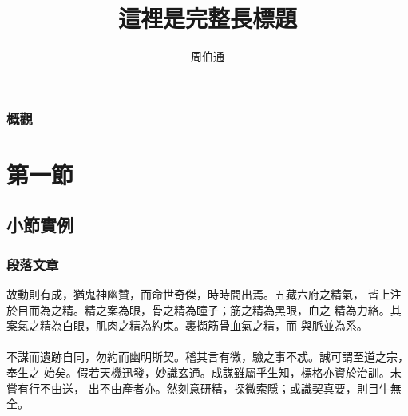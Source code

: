\documentclass{beamer}
\title[這裡是短標題]{\iyan 這裡是完整長標題} %
\author{周伯通} %
\institute[Uranus] %
{
天王星大學\\ %
\medskip
\texttt{john@smith.com} %
}
\date{\zhtoday} %
\begin{document}
\begin{frame}
\titlepage %
\end{frame}

\begin{frame}
\frametitle{\iyan 概觀} %
\tableofcontents %
\end{frame}


\section{第一節} %

\subsection{小節實例} %

\begin{frame}
\frametitle{\iyan 段落文章}
故動則有成，猶鬼神幽贊，而命世奇傑，時時間出焉。五藏六府之精氣，
皆上注於目而為之精。精之案為眼，骨之精為瞳子；筋之精為黑眼，血之
精為力絡。其案氣之精為白眼，肌肉之精為約束。裹擷筋骨血氣之精，而
與脈並為系。\\~\\

不謀而遺跡自同，勿約而幽明斯契。稽其言有微，驗之事不忒。誠可謂至道之宗，奉生之
始矣。假若天機迅發，妙識玄通。成謀雖屬乎生知，標格亦資於治訓。未嘗有行不由送，
出不由產者亦。然刻意研精，探微索隱；或識契真要，則目牛無全。
\end{frame}
\end{document}
